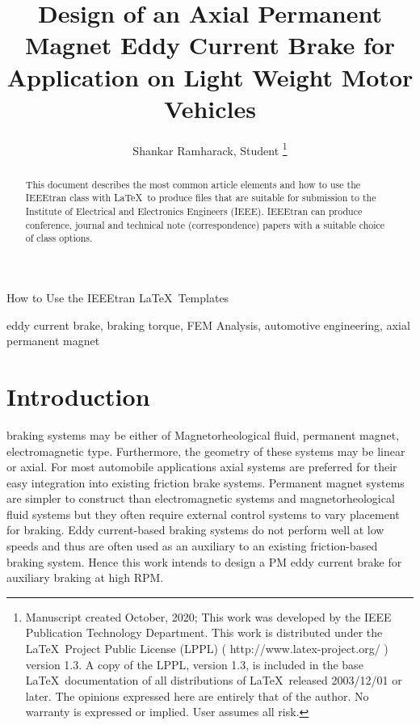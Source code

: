 \documentclass[lettersize,journal]{IEEEtran}
\begin{document}
\title{Design of an Axial Permanent Magnet Eddy Current Brake for Application on Light Weight Motor Vehicles}
\author{Shankar Ramharack, Student
\thanks{Manuscript created October, 2020; This work was developed by the IEEE Publication Technology Department. This work is distributed under the \LaTeX \ Project Public License (LPPL) ( http://www.latex-project.org/ ) version 1.3. A copy of the LPPL, version 1.3, is included in the base \LaTeX \ documentation of all distributions of \LaTeX \ released 2003/12/01 or later. The opinions expressed here are entirely that of the author. No warranty is expressed or implied. User assumes all risk.}}

%
{How to Use the IEEEtran \LaTeX \ Templates}

\maketitle

\begin{abstract}
This document describes the most common article elements and how to use the IEEEtran class with \LaTeX \ to produce files that are suitable for submission to the Institute of Electrical and Electronics Engineers (IEEE).  IEEEtran can produce conference, journal and technical note (correspondence) papers with a suitable choice of class options.
\end{abstract}

\begin{IEEEkeywords}
eddy current brake, braking torque, FEM Analysis, automotive engineering, axial permanent magnet
\end{IEEEkeywords}


\section{Introduction}
 braking systems may be either of Magnetorheological fluid, permanent magnet, electromagnetic type. Furthermore, the geometry of these systems may be linear or axial. For most automobile applications axial systems are preferred for their easy integration into existing friction brake systems. Permanent magnet systems are simpler to construct than electromagnetic systems and magnetorheological fluid systems but they often require external control systems to vary placement for braking. Eddy current-based braking systems do not perform well at low speeds and thus are often used as an auxiliary to an existing friction-based braking system. Hence this work intends to design a PM eddy current brake for auxiliary braking at high RPM.
\end{document}
